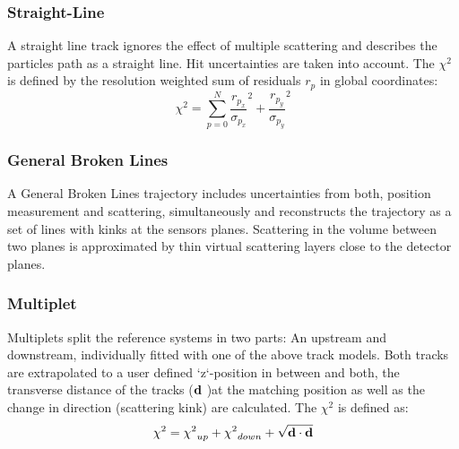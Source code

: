 \subsubsection*{Straight-Line}
A straight line track ignores the effect of multiple scattering and describes
the particles path as a straight line. Hit uncertainties are taken into account.
The $\chi^2$ is defined by the resolution weighted sum of residuals $r_p$ in global coordinates:
\begin{equation}
\chi^2 =  \sum_{p=0}^{N} {\frac{r_{p_x}}{\sigma_{p_x}}}^{2} + {\frac{r_{p_y}}{\sigma_{p_y}}}^{2}
\end{equation}

\subsubsection*{General Broken Lines}
A General Broken Lines trajectory \cite{Kleinwort:2012np} includes uncertainties from
both, position measurement and scattering, simultaneously and reconstructs the
trajectory as a set of lines with kinks at the sensors planes. Scattering in
the volume between two planes is approximated by thin virtual scattering
layers close to the detector planes.

\subsubsection*{Multiplet}
Multiplets  split the reference systems in two parts: An upstream and downstream, individually fitted with one of the above track models.
Both tracks are  extrapolated to a user defined `z`-position in between and both, the transverse distance of the tracks ($\bold{d}$ )at the matching position as well as the change in direction (scattering kink) are calculated. The  $\chi^2$ is defined as:
\begin{equation}
	\chi^2 = {\chi^2}_{up} + {\chi^2}_{down} + \sqrt{\bold{d}\cdot\bold{d}}
\end{equation}
